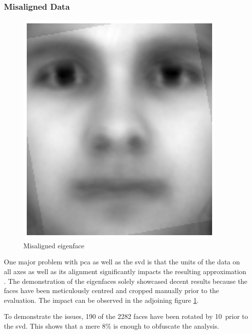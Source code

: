 \subsubsection{Misaligned Data}


\begin{figure}
    \centering
    \includegraphics[width=0.9\linewidth]{external_content/media/rotation/average_face-rotation.png}
    \captionsetup{justification=centering}
    \caption{Misaligned eigenface}
    \label{fig:misalignedEigenface}
\end{figure}

One major problem with \gls{pca} as well as the \gls{svd} is that the units of the data on all axes as well as its alignment significantly impacts the resulting approximation \cite{brunton2019data}.
The demonstration of the eigenfaces solely showcased decent results because the faces have been meticulously centred and cropped manually prior to the evaluation.
The impact can be observed in the adjoining figure \ref{fig:misalignedEigenface}.

To demonstrate the issues, 190 of the 2282 faces have been rotated by 10\textdegree\ prior to the \gls{svd}.
This shows that a mere 8\% is enough to obfuscate the analysis.



